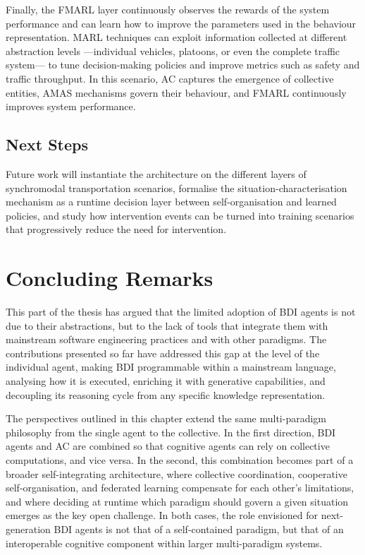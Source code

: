 Finally,
the \ac{FMARL} layer
continuously observes the rewards of the system performance
and
can learn how to improve the parameters used in the behaviour representation.
%
\ac{MARL} techniques
can exploit information collected at different abstraction levels%
---individual vehicles, platoons, or even the complete traffic system---%
to tune decision-making policies
and
improve metrics such as safety and traffic throughput.
%
In this scenario,
\ac{AC} captures the emergence of collective entities,
\ac{AMAS} mechanisms govern their behaviour,
and
\ac{FMARL} continuously improves system performance.

\subsection{Next Steps}

Future work will
instantiate the architecture on the different layers of
synchromodal transportation scenarios,
formalise the situation-characterisation mechanism as a runtime decision layer
between
self-organisation and learned policies,
and
study how intervention events can be turned into training scenarios
that progressively reduce the need for intervention.

\section{Concluding Remarks}
\label{sec:perspectives-conclusion}

This part of the thesis has argued that the limited adoption of \ac{BDI} agents
is not due to their abstractions,
but to the lack of tools that integrate them with mainstream software engineering practices and with other paradigms.
%
The contributions presented so far have addressed this gap at the level of the individual agent,
making \ac{BDI} programmable within a mainstream language,
analysing how it is executed,
enriching it with generative capabilities,
and decoupling its reasoning cycle from any specific knowledge representation.

The perspectives outlined in this chapter extend the same multi-paradigm philosophy
from the single agent to the collective.
%
In the first direction,
\ac{BDI} agents and \ac{AC} are combined so that cognitive agents can rely on collective computations,
and vice versa.
%
In the second,
this combination becomes part of a broader self-integrating architecture,
where collective coordination, cooperative self-organisation, and federated learning
compensate for each other's limitations,
and where deciding at runtime which paradigm should govern a given situation
emerges as the key open challenge.
%
In both cases,
the role envisioned for next-generation \ac{BDI} agents is not that of a self-contained paradigm,
but that of an interoperable cognitive component
within larger multi-paradigm systems.
